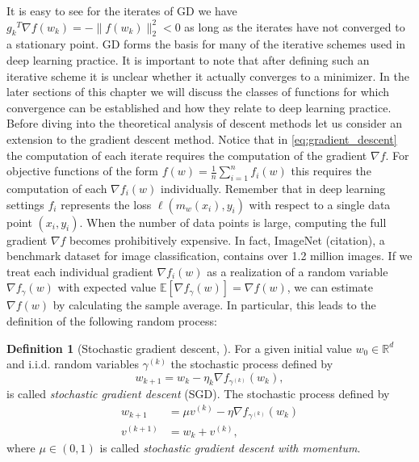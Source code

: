 \documentclass[12pt]{article}
\theoremstyle{definition}
\newtheorem{definition}[definition]{Definition}
\numberwithin{equation}{section}
\newcommand{\ev}[1]{\mathbb{E}\left[{#1}\right]}
\newcommand{\norm}[1]{\lVert{#1}\rVert_2}
\begin{document}
It is easy to see for the iterates of GD we have ${g_k}^T \nabla f(w_{k}) = -\norm{ f(w_{k}) }^2 < 0$ as long as the iterates have not converged to a stationary point. GD forms the basis for many of the iterative schemes used in deep learning practice. It is important to note that after defining such an iterative scheme it is unclear whether it actually converges to a minimizer. In the later sections of this chapter we will discuss the classes of functions for which convergence can be established and how they relate to deep learning practice. Before diving into the theoretical analysis of descent methods let us consider an extension to the gradient descent method.
Notice that in \eqref{eq:gradient_descent} the computation of each iterate requires the computation of the gradient $\nabla f$. For objective functions of the form $f(w) = \frac{1}{n} \sum_{i=1}^n f_i(w)$ this requires the computation of each $\nabla f_i(w)$ individually. Remember that in deep learning settings $f_i$ represents the loss $\ell(m_w(x_i), y_i)$ with respect to a single data point $(x_i, y_i)$. When the number of data points is large, computing the full gradient $\nabla f$ becomes prohibitively expensive. In fact, ImageNet (citation), a benchmark dataset for image classification, contains over 1.2 million images. If we treat each individual gradient $\nabla f_i(w)$ as a realization of a random variable $\nabla f_{\gamma}(w)$ with expected value $\ev{\nabla f_{\gamma}(w)} = \nabla f(w)$, we can estimate $\nabla f(w)$ by calculating the sample average. In particular, this leads to the definition of the following random process:
\begin{definition}[Stochastic gradient descent, ]
  \label{def:sgd}
  For a given initial value $w_{0} \in \mathbb{R}^d$ and i.i.d. random variables $\gamma^{(k)}$ the stochastic process defined by
  \begin{equation}
    \label{eq:stochastic_gradient_descent}
    w_{k+1} = w_{k} - \eta_k \nabla f_{\gamma^{(k)}}(w_{k}),
  \end{equation}
  is called \emph{stochastic gradient descent} (SGD).
  The stochastic process defined by
  \begin{align*}
    w_{k+1} &= \mu v^{(k)} - \eta \nabla f_{\gamma^{(k)}}(w_{k}) \\
    v^{(k+1)} &= w_{k} + v^{(k)},
  \end{align*}
  where $\mu \in (0,1)$ is called \emph{stochastic gradient descent with momentum}. 
\end{definition}
\end{document}
